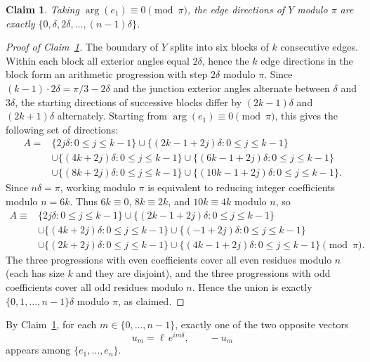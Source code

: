 \documentclass{article}
\newtheorem{claim}[thr]{Claim}
\theoremstyle{definition}
\let\le\leqslant
\begin{document}
\begin{claim}\label{clm:directions}
Taking $\arg(e_1)\equiv 0\pmod\pi$, the edge directions of $Y$ modulo $\pi$
are exactly $\{0,\delta,2\delta,\dots,(n-1)\delta\}$.
\end{claim}
\begin{proof}[Proof of Claim~\ref{clm:directions}]
The boundary of $Y$ splits into six blocks of $k$ consecutive edges.
Within each block all exterior angles equal $2\delta$, hence the $k$ edge directions in the block form an arithmetic progression
with step $2\delta$ modulo $\pi$.
Since $(k-1)\cdot 2\delta=\pi/3-2\delta$ and the junction exterior angles alternate between $\delta$ and $3\delta$,
the starting directions of successive blocks differ by $(2k-1)\delta$ and $(2k+1)\delta$ alternately.
Starting from $\arg(e_1)\equiv 0\pmod\pi$, this gives the following set of directions:
\[
\begin{aligned}
A =& \{2j\delta : 0 \le j \le k-1\}
\cup \{(2k - 1 + 2j)\delta : 0 \le j \le k - 1\}\\
&
\cup \{(4k + 2j)\delta : 0 \le j \le k - 1\}\cup \{(6k - 1 + 2j)\delta : 0 \le j \le k - 1\}\\
&
\cup \{(8k + 2j)\delta : 0 \le j \le k - 1\}
\cup \{(10k - 1 + 2j)\delta : 0 \le j \le k - 1\}.
\end{aligned}
\]
Since $n\delta=\pi$, working modulo $\pi$ is equivalent to reducing integer coefficients modulo $n=6k$.
Thus $6k\equiv 0$, $8k\equiv 2k$, and $10k\equiv 4k$ modulo $n$, so
\[
\begin{aligned}
A \equiv&
\{2j\delta : 0 \le j \le k-1\}
\cup \{(2k - 1 + 2j)\delta : 0 \le j \le k - 1\}\\
&
\cup \{(4k + 2j)\delta : 0 \le j \le k - 1\}\cup \{(-1 + 2j)\delta : 0 \le j \le k - 1\}\\
&
\cup \{(2k + 2j)\delta : 0 \le j \le k - 1\}
\cup \{(4k - 1 + 2j)\delta : 0 \le j \le k - 1\}
\pmod\pi.
\end{aligned}
\]
The three progressions with even coefficients cover all even residues modulo $n$ (each has size $k$ and they are disjoint),
and the three progressions with odd coefficients cover all odd residues modulo $n$.
Hence the union is exactly $\{0,1,\dots,n-1\}\delta$ modulo $\pi$, as claimed.
\end{proof}





By Claim~\ref{clm:directions}, for each $m\in\{0,\dots,n-1\}$,
exactly one of the two opposite vectors
\[
u_m = \ell\, e^{im\delta}, \qquad -u_m
\]
appears among $\{e_1,\dots,e_n\}$.
\end{document}
